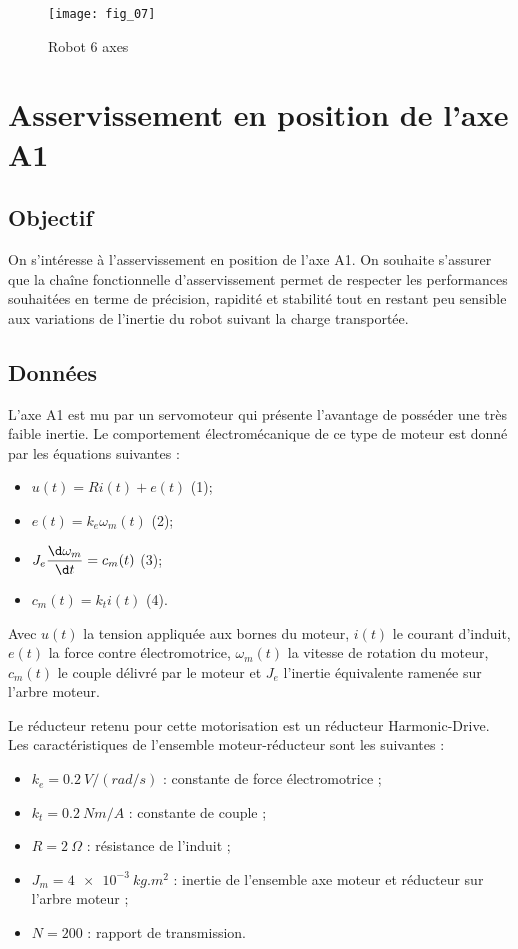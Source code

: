 
\begin{figure}[!h]
\centering
\texttt{[image: fig\_07]}
\caption{Robot 6 axes \label{kuka:fig:07}}
\end{figure}



\section{Asservissement en position de l'axe A1}

\subsection{Objectif}
On s’intéresse à l’asservissement en position de l’axe A1. On souhaite s’assurer que la chaîne 
fonctionnelle d’asservissement permet de respecter les performances souhaitées en terme de 
précision, rapidité et stabilité tout en restant peu sensible aux variations de l’inertie du robot 
suivant la charge transportée. 

\subsection{Données} 
L’axe A1 est mu par un servomoteur qui présente l'avantage de posséder une très faible 
inertie. Le comportement électromécanique de ce type de moteur est donné par les équations 
suivantes : 
\begin{itemize}%
\item $u(t) = Ri(t) + e(t)$ (1);
\item $e(t) = k_e \omega_m(t)$  (2);
\item $J_e \dfrac{\d \omega_m}{\d t} = c_m(t)$ (3);
\item $c_m(t) = k_t i(t)$ (4).
\end{itemize}

Avec $u(t)$ la tension appliquée aux bornes du moteur, $i(t)$ le courant d’induit, $e(t)$ la force 
contre électromotrice, $\omega_m(t)$ la vitesse de rotation du moteur, $c_m(t)$ le couple délivré par le 
moteur et $J_e$ l’inertie équivalente ramenée sur l’arbre moteur. 

Le réducteur retenu pour cette motorisation est un réducteur Harmonic-Drive. Les 
caractéristiques de l’ensemble moteur-réducteur sont les suivantes : 
\begin{itemize}
\item $k_e = \SI{0,2}{V/(rad/s)}$ : constante de force électromotrice ; 
\item $k_t = \SI{0,2}{Nm/A}$ : constante de couple ; 
\item $R = \SI{2}{\Omega}$ : résistance de l’induit ; 
\item $J_m = \SI{4e-3}{kg.m^2}$ : inertie de l’ensemble axe moteur et réducteur sur l'arbre moteur ; 
\item $N = 200$ : rapport de transmission. 
\end{itemize}

